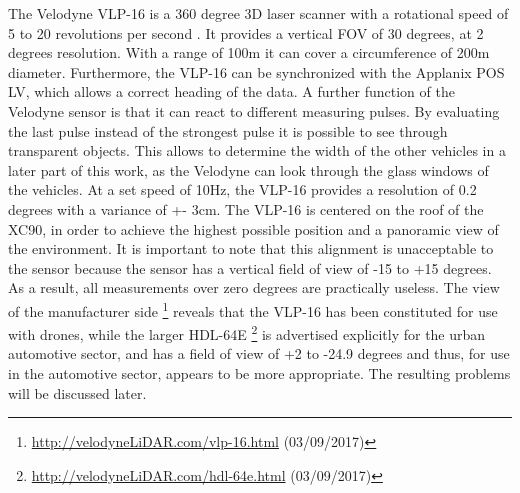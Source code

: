 The Velodyne VLP-16 is a 360 degree 3D laser scanner with a rotational speed of 5 to 20 revolutions per second \cite{manVEL}.
It provides a vertical FOV of 30 degrees, at 2 degrees resolution.
With a range of 100m it can cover a circumference of 200m diameter. 
Furthermore, the VLP-16 can be synchronized with the Applanix POS LV, which allows a correct heading of the data. 
A further function of the Velodyne sensor is that it can react to different measuring pulses. 
By evaluating the last pulse instead of the strongest pulse it is possible to see through transparent objects. 
This allows to determine the width of the other vehicles in a later part of this work, as the Velodyne can look through the glass windows of the vehicles. 
At a set speed of 10Hz, the VLP-16 provides a resolution of 0.2 degrees with a variance of +- 3cm. 
The VLP-16 is centered on the roof of the XC90, in order to achieve the highest possible position and a panoramic view of the environment.
It is important to note that this alignment is unacceptable to the sensor because the sensor has a vertical field of view of -15 to +15 degrees.
As a result, all measurements over zero degrees are practically useless. The view of the manufacturer side
\footnote{\url{http://velodyneLiDAR.com/vlp-16.html} (03/09/2017)}
reveals that the VLP-16 has been constituted for use with drones, while the larger HDL-64E
\footnote{\url{http://velodyneLiDAR.com/hdl-64e.html} (03/09/2017)}
is advertised explicitly for the urban automotive sector, and has a field of view of +2 to -24.9 degrees and thus, for use in the
automotive sector, appears to be more appropriate. The resulting problems will be discussed later.



